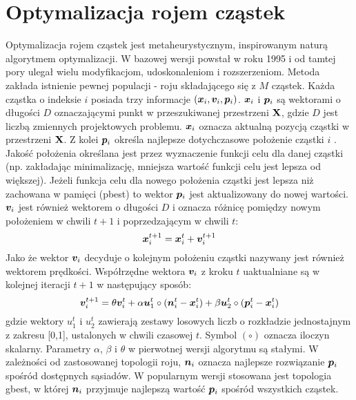 \section{Optymalizacja rojem cząstek}
Optymalizacja rojem cząstek  jest metaheurystycznym, inspirowanym naturą algorytmem optymalizacji. W bazowej wersji powstał w roku 1995 \parencite{Kennedy1995a,Eberhart1995} i od tamtej pory ulegał wielu modyfikacjom, udoskonaleniom i rozszerzeniom. Metoda zakłada istnienie pewnej populacji - roju składającego się z $M$ cząstek. Każda cząstka o indeksie $i$ posiada trzy informacje $(\bm{x}_i,\bm{v}_i,\bm{p}_i)$. $\bm{x}_i$ i $\bm{p}_i$ są wektorami o długości $D$ oznaczającymi punkt w przeszukiwanej przestrzeni $\mathbf{X}$, gdzie $D$ jest liczbą zmiennych projektowych problemu. $\bm{x}_i$ oznacza aktualną pozycją cząstki w przestrzeni $\mathbf{X}$. Z kolei $\bm{p}_i$ określa najlepsze dotychczasowe położenie cząstki $i$ . Jakość położenia określana jest przez wyznaczenie funkcji celu dla danej cząstki (np. zakładając minimalizację, mniejsza wartość funkcji celu jest lepsza od większej). Jeżeli funkcja celu dla nowego położenia cząstki jest lepsza niż zachowana w pamięci (pbest) to wektor $\bm{p}_i$ jest aktualizowany do nowej wartości. $\bm{v}_i$ jest również wektorem o długości $D$ i oznacza różnicę pomiędzy nowym położeniem w chwili $t+1$ i poprzedzającym w chwili $t$:
\begin{equation}
	\bm{x}_i^{t+1}=\bm{x}_i^t+\bm{v}_i^{t+1}
\end{equation}
 Jako że wektor $\bm{v}_i$ decyduje o kolejnym położeniu cząstki nazywany jest również wektorem prędkości. Współrzędne wektora $\bm{v}_i$ z kroku $t$ uaktualniane są w kolejnej iteracji $t+1$ w następujący sposób:
\begin{equation}
	\bm{v}_{i}^{t+1}=\theta\bm{v}_i^t+\alpha\bm{u}_1^t\circ (\bm{n}_i^t-\bm{x}_i^t)+\beta\bm{u}_2^t\circ(\bm{p}_i^t-\bm{x}_i^t)
\end{equation}
gdzie wektory $u_1^t$ i $u_2^t$ zawierają zestawy losowych liczb o rozkładzie jednostajnym z zakresu [0,1], ustalonych w chwili czasowej $t$. Symbol $(\circ)$ oznacza iloczyn skalarny. Parametry $\alpha$, $\beta$ i $\theta$ w pierwotnej wersji algorytmu są stałymi. W zależności od zastosowanej topologii roju, $\bm{n}_i$ oznacza najlepsze rozwiązanie $\bm{p}_i$ spośród dostępnych sąsiadów. W popularnym wersji stosowana jest topologia gbest, w której $\bm{n}_i$ przyjmuje najlepszą wartość $\bm{p}_i$ spośród wszystkich cząstek.
